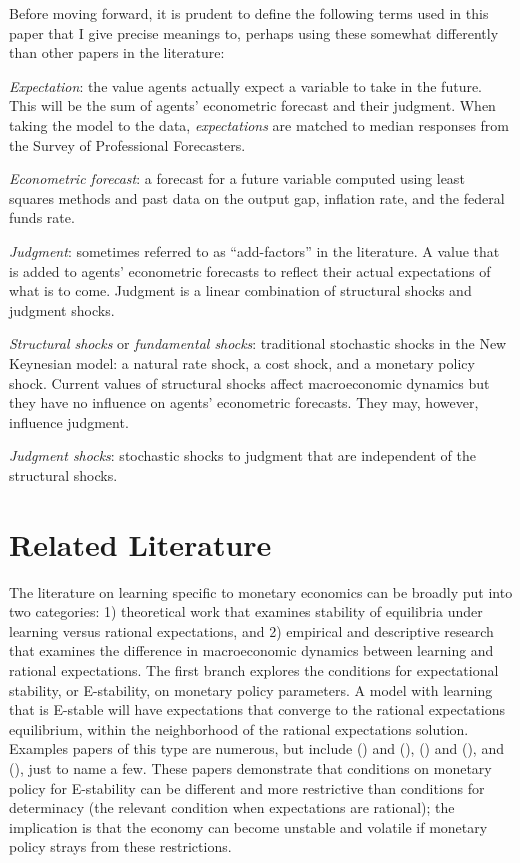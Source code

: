 \documentclass[12pt]{article}
\newcommand{\bd}{\begin{description}}
\newcommand{\ed}{\end{description}}
\newcommand{\citee}[1]{\citename{#1} (\citeyear{#1})}
\begin{document}
Before moving forward, it is prudent to define the following terms used in this paper that I give precise meanings to, perhaps using these somewhat differently than other papers in the literature:
\bd
\item \textit{Expectation}: the value agents actually expect a variable to take in the future.  This will be the sum of agents' econometric forecast and their judgment.  When taking the model to the data, \textit{expectations} are matched to median responses from the Survey of Professional Forecasters.
\item \textit{Econometric forecast}: a forecast for a future variable computed using least squares methods and past data on the output gap, inflation rate, and the federal funds rate.
\item \textit{Judgment}: sometimes referred to as ``add-factors'' in the literature.  A value that is added to agents' econometric forecasts to reflect their actual expectations of what is to come.  Judgment is a linear combination of structural shocks and judgment shocks.  
\item \textit{Structural shocks} or \textit{fundamental shocks}: traditional stochastic shocks in the New Keynesian model: a natural rate shock, a cost shock, and a monetary policy shock.  Current values of structural shocks affect macroeconomic dynamics but they have no influence on agents' econometric forecasts.  They may, however, influence judgment.
\item \textit{Judgment shocks}: stochastic shocks to judgment that are independent of the structural shocks.
\ed

\section{Related Literature}

The literature on learning specific to monetary economics can be broadly put into two categories: 1) theoretical work that examines stability of equilibria under learning versus rational expectations, and 2) empirical and descriptive research that examines the difference in macroeconomic dynamics between learning and rational expectations.  The first branch explores the conditions for expectational stability, or E-stability, on monetary policy parameters.  A model with learning that is E-stable will have expectations that converge to the rational expectations equilibrium, within the neighborhood of the rational expectations solution.  Examples papers of this type are numerous, but include  (\citeyear{bullardmitra2002}) and (\citeyear{bullardmitra2007}),  (\citeyear{eh2003b}) and (\citeyear{eh2003}), and \citee{preston2005}, just to name a few.  These papers demonstrate that conditions on monetary policy for E-stability can be different and more restrictive than conditions for determinacy (the relevant condition when expectations are rational); the implication is that the economy can become unstable and volatile if monetary policy strays from these restrictions.
\end{document}
